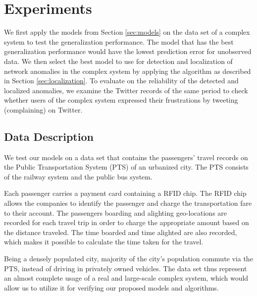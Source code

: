 \documentclass{sig-alternate}
\begin{document}
\section{Experiments}
\label{sec:experiments}

We first apply the models from Section \ref{sec:models} on the data set of a complex system to test the generalization performance. The model that has the best generalization performance would have the lowest prediction error for unobserved data. We then select the best model to use for detection and localization of network anomalies in the complex system by applying the algorithm as described in Section \ref{sec:localization}. To evaluate on the reliability of the detected and localized anomalies, we examine the Twitter records of the same period to check whether users of the complex system expressed their frustrations by tweeting (complaining) on Twitter.

\subsection{Data Description}

We test our models on a data set that contains the passengers' travel records on the Public Transportation System (PTS) of an urbanized city. The PTS consists of the railway system and the public bus system.


Each passenger carries a payment card containing a RFID chip. The RFID chip allows the companies to identify the passenger and charge the transportation fare to their account. The passengers boarding and alighting geo-locations are recorded for each travel trip in order to charge the appropriate amount based on the distance traveled. The time boarded and time alighted are also recorded, which makes it possible to calculate the time taken for the travel.

Being a densely populated city, majority of the city's population commute via the PTS, instead of driving in privately owned vehicles. The data set thus represent an almost complete usage of a real and large-scale complex system, which would allow us to utilize it for verifying our proposed models and algorithms.
\end{document}
